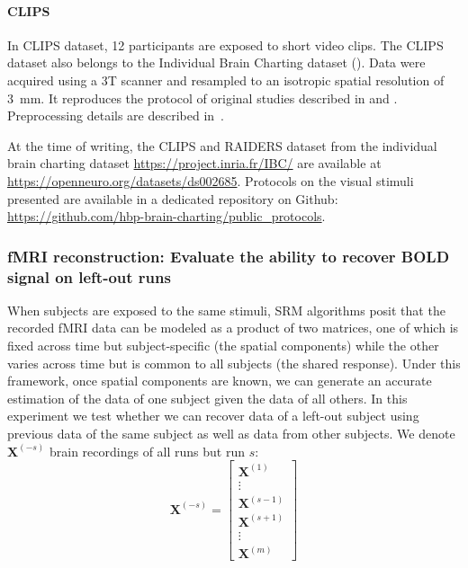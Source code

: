\paragraph{CLIPS}
In CLIPS dataset, 12 participants are exposed to short video clips. 
%
The CLIPS dataset also belongs to the Individual Brain Charting dataset (\cite{ibc}).
%
Data were acquired using a 3T scanner and resampled to an isotropic spatial resolution of 3~mm.
%
It reproduces the protocol of original studies described in \cite{nishimoto2011reconstructing} and \cite{huth2012continuous}.
%
Preprocessing details are described in~\cite{ibc}.

At the time of writing, the CLIPS and RAIDERS dataset from the individual brain charting dataset \url{https://project.inria.fr/IBC/} are available at \url{https://openneuro.org/datasets/ds002685}.
%
Protocols on the visual stimuli presented are available in a dedicated repository on Github: \url{https://github.com/hbp-brain-charting/public_protocols}.


\subsubsection{fMRI reconstruction: Evaluate the ability to recover BOLD signal on left-out runs}
\label{reconstruction}

When subjects are exposed to the same stimuli, SRM algorithms posit that the recorded fMRI data can be modeled as a product of two matrices, one of which is fixed across time but subject-specific (the spatial components) while the other varies across time but is common to all subjects (the shared response).
%
Under this framework, once spatial components are known, we can generate an accurate estimation of the data of one subject given the data of all others.
%
In this experiment we test whether we can recover data of a left-out subject using previous data of the same subject as well as data from other subjects. 
We denote $\mathbf{X}^{(-s)}$ brain recordings of all runs but run $s$:
 \begin{equation*}
	 \mathbf{X}^{(-s)} = 
\begin{bmatrix}
	\mathbf{X}^{(1)} \\
	\vdots \\
	\mathbf{X}^{(s-1)} \\
	\mathbf{X}^{(s+1)} \\
	\vdots \\
	\mathbf{X}^{(m)}
\end{bmatrix}
\end{equation*}

